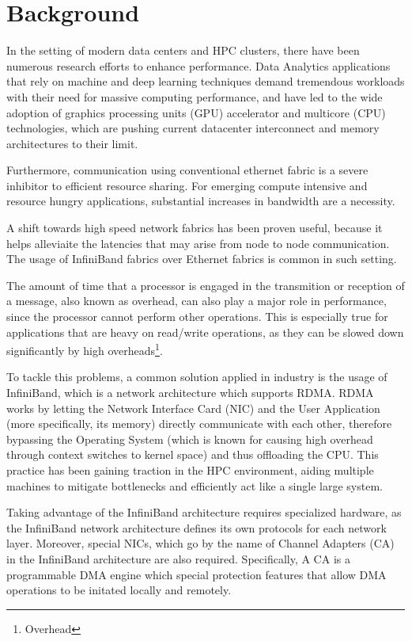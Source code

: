 \section{Background}

In the setting of modern data centers and HPC clusters, there have been numerous research efforts
to enhance performance. Data Analytics applications that rely on machine and deep learning techniques demand
tremendous workloads with their need for massive computing performance, and have led to the wide adoption of graphics
processing units (GPU) accelerator and multicore (CPU) technologies, which are pushing current datacenter interconnect
and memory architectures to their limit\cite{shalfHPCInterconnectsEnd2019}.

Furthermore, communication using conventional ethernet fabric is a severe inhibitor to efficient resource sharing.
For emerging compute intensive and resource hungry applications, substantial increases in bandwidth are a necessity\cite{shalfHPCInterconnectsEnd2019}.

A shift towards high speed network fabrics has been proven useful,
because it helps alleviaite the latencies that may arise from node to node communication.
The usage of InfiniBand fabrics over Ethernet fabrics is common in such setting.

The amount of time that a processor is engaged in the transmition or reception of a message, also known as overhead,
can also play a major role in performance, since the processor cannot perform other operations.
This is especially true for applications that are heavy on read/write operations, as they can
be slowed down significantly by high overheads\footnote{Overhead}\cite{martin97}.

To tackle this problems, a common solution applied in industry is the usage of InfiniBand, which
is a network architecture which supports RDMA.
RDMA works by letting the Network Interface Card (NIC) and the User Application (more specifically, its memory)
directly communicate with each other, therefore bypassing the Operating System (which is known for
causing high overhead through context switches to kernel space) and thus offloading the CPU. This practice has been
gaining traction in the HPC environment, aiding multiple machines to mitigate bottlenecks and efficiently act like a
single large system.

Taking advantage of the InfiniBand architecture requires specialized hardware, as the InfiniBand network architecture defines
its own protocols for each network layer. Moreover, special NICs, which go by the name of Channel Adapters (CA) in the InfiniBand
architecture are also required. Specifically, A CA is a programmable DMA engine which special protection features that allow
DMA operations to be initated locally and remotely\cite{infinibandvol107}.




